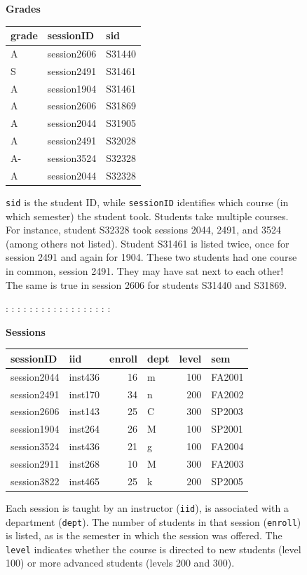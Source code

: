 \documentclass[
  letterpaper,
  DIV=11,
  numbers=noendperiod,
  oneside]{scrartcl}
\begin{document}
\begin{figure}

\textbf{Grades}

\begin{tabular}{l|l|l}
\hline
grade & sessionID & sid\\
\hline
A & session2606 & S31440\\
\hline
S & session2491 & S31461\\
\hline
A & session1904 & S31461\\
\hline
A & session2606 & S31869\\
\hline
A & session2044 & S31905\\
\hline
A & session2491 & S32028\\
\hline
A- & session3524 & S32328\\
\hline
A & session2044 & S32328\\
\hline
\end{tabular}

\texttt{sid} is the student ID, while \texttt{sessionID} identifies
which course (in which semester) the student took. Students take
multiple courses. For instance, student S32328 took sessions 2044, 2491,
and 3524 (among others not listed). Student S31461 is listed twice, once
for session 2491 and again for 1904. These two students had one course
in common, session 2491. They may have sat next to each other! The same
is true in session 2606 for students S31440 and S31869.

: : : : : : : : : : : : : : : : : :

\textbf{Sessions}

\begin{tabular}{l|l|r|l|r|l}
\hline
sessionID & iid & enroll & dept & level & sem\\
\hline
session2044 & inst436 & 16 & m & 100 & FA2001\\
\hline
session2491 & inst170 & 34 & n & 200 & FA2002\\
\hline
session2606 & inst143 & 25 & C & 300 & SP2003\\
\hline
session1904 & inst264 & 26 & M & 100 & SP2001\\
\hline
session3524 & inst436 & 21 & g & 100 & FA2004\\
\hline
session2911 & inst268 & 10 & M & 300 & FA2003\\
\hline
session3822 & inst465 & 25 & k & 200 & SP2005\\
\hline
\end{tabular}

Each session is taught by an instructor (\texttt{iid}), is associated
with a department (\texttt{dept}). The number of students in that
session (\texttt{enroll}) is listed, as is the semester in which the
session was offered. The \texttt{level} indicates whether the course is
directed to new students (level 100) or more advanced students (levels
200 and 300).


\end{figure}
\end{document}
